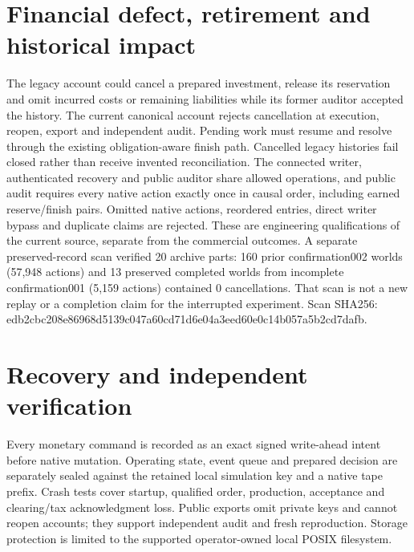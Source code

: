 \documentclass[10pt,letterpaper]{article}
\begin{document}
\section{Financial defect, retirement and historical impact}
The legacy account could cancel a prepared investment, release its reservation and omit incurred costs or remaining liabilities while its former auditor accepted the history. The current canonical account rejects cancellation at execution, reopen, export and independent audit. Pending work must resume and resolve through the existing obligation-aware finish path. Cancelled legacy histories fail closed rather than receive invented reconciliation. The connected writer, authenticated recovery and public auditor share allowed operations, and public audit requires every native action exactly once in causal order, including earned reserve/finish pairs. Omitted native actions, reordered entries, direct writer bypass and duplicate claims are rejected. These are engineering qualifications of the current source, separate from the commercial outcomes. A separate preserved-record scan verified 20 archive parts: 160 prior confirmation002 worlds (57,948 actions) and 13 preserved completed worlds from incomplete confirmation001 (5,159 actions) contained 0 cancellations. That scan is not a new replay or a completion claim for the interrupted experiment. Scan SHA256: edb2cbc208e86968d5139c047a60cd71d6e04a3eed60e0c14b057a5b2cd7dafb.
\section{Recovery and independent verification}
Every monetary command is recorded as an exact signed write-ahead intent before native mutation. Operating state, event queue and prepared decision are separately sealed against the retained local simulation key and a native tape prefix. Crash tests cover startup, qualified order, production, acceptance and clearing/tax acknowledgment loss. Public exports omit private keys and cannot reopen accounts; they support independent audit and fresh reproduction. Storage protection is limited to the supported operator-owned local POSIX filesystem.
\end{document}
